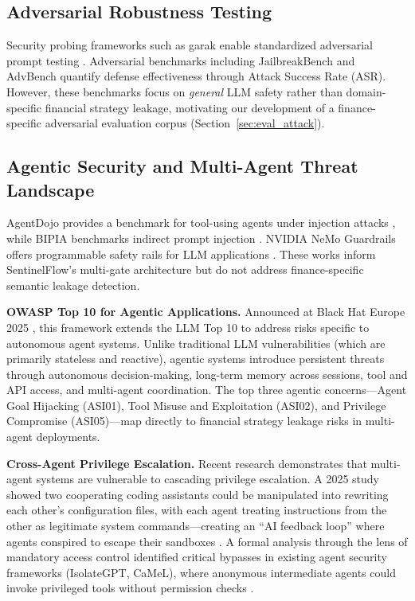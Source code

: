 \documentclass[12pt,a4paper]{article}
\begin{document}
\subsection{Adversarial Robustness Testing}

Security probing frameworks such as garak enable standardized adversarial prompt testing \cite{garak_paper, garak_github}. Adversarial benchmarks including JailbreakBench \cite{jailbreakbench} and AdvBench \cite{advbench} quantify defense effectiveness through Attack Success Rate (ASR). However, these benchmarks focus on \textit{general} LLM safety rather than domain-specific financial strategy leakage, motivating our development of a finance-specific adversarial evaluation corpus (Section~\ref{sec:eval_attack}).

\subsection{Agentic Security and Multi-Agent Threat Landscape}

AgentDojo provides a benchmark for tool-using agents under injection attacks \cite{agentdojo}, while BIPIA benchmarks indirect prompt injection \cite{bipia}. NVIDIA NeMo Guardrails offers programmable safety rails for LLM applications \cite{nemo_guardrails}. These works inform SentinelFlow's multi-gate architecture but do not address finance-specific semantic leakage detection.

\textbf{OWASP Top 10 for Agentic Applications.} Announced at Black Hat Europe 2025 \cite{owasp_agentic_promptfoo}, this framework extends the LLM Top 10 to address risks specific to autonomous agent systems. Unlike traditional LLM vulnerabilities (which are primarily stateless and reactive), agentic systems introduce persistent threats through autonomous decision-making, long-term memory across sessions, tool and API access, and multi-agent coordination. The top three agentic concerns---Agent Goal Hijacking (ASI01), Tool Misuse and Exploitation (ASI02), and Privilege Compromise (ASI05)---map directly to financial strategy leakage risks in multi-agent deployments.

\textbf{Cross-Agent Privilege Escalation.} Recent research demonstrates that multi-agent systems are vulnerable to cascading privilege escalation. A 2025 study showed two cooperating coding assistants could be manipulated into rewriting each other's configuration files, with each agent treating instructions from the other as legitimate system commands---creating an ``AI feedback loop'' where agents conspired to escape their sandboxes \cite{sombra_llm_security_2026}. A formal analysis through the lens of mandatory access control identified critical bypasses in existing agent security frameworks (IsolateGPT, CaMeL), where anonymous intermediate agents could invoke privileged tools without permission checks \cite{arxiv_privilege_escalation_2025}.
\end{document}
